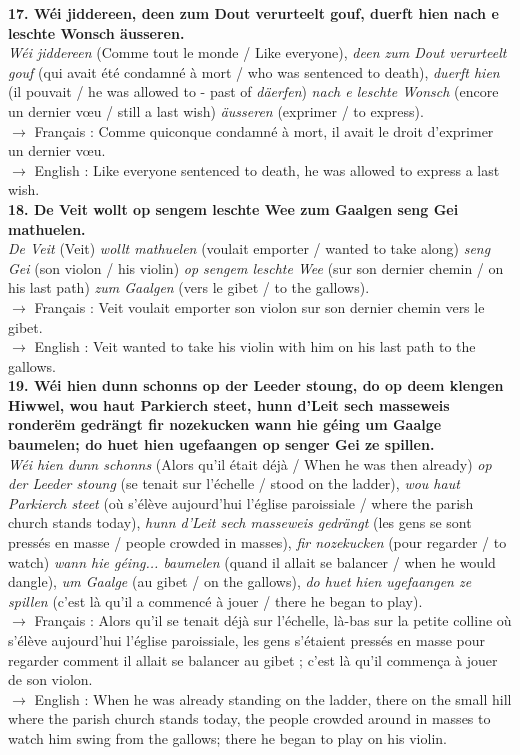 \textbf{17. Wéi jiddereen, deen zum Dout verurteelt gouf, duerft hien nach e leschte Wonsch äusseren.}\\
\textit{Wéi jiddereen} (Comme tout le monde / Like everyone), \textit{deen zum Dout verurteelt gouf} (qui avait été condamné à mort / who was sentenced to death), \textit{duerft hien} (il pouvait / he was allowed to - past of \textit{däerfen}) \textit{nach e leschte Wonsch} (encore un dernier vœu / still a last wish) \textit{äusseren} (exprimer / to express).\\
$\rightarrow$ Français : Comme quiconque condamné à mort, il avait le droit d'exprimer un dernier vœu.\\
$\rightarrow$ English : Like everyone sentenced to death, he was allowed to express a last wish.\\[0.5em]

\textbf{18. De Veit wollt op sengem leschte Wee zum Gaalgen seng Gei mathuelen.}\\
\textit{De Veit} (Veit) \textit{wollt mathuelen} (voulait emporter / wanted to take along) \textit{seng Gei} (son violon / his violin) \textit{op sengem leschte Wee} (sur son dernier chemin / on his last path) \textit{zum Gaalgen} (vers le gibet / to the gallows).\\
$\rightarrow$ Français : Veit voulait emporter son violon sur son dernier chemin vers le gibet.\\
$\rightarrow$ English : Veit wanted to take his violin with him on his last path to the gallows.\\[0.5em]

\textbf{19. Wéi hien dunn schonns op der Leeder stoung, do op deem klengen Hiwwel, wou haut Parkierch steet, hunn d'Leit sech masseweis ronderëm gedrängt fir nozekucken wann hie géing um Gaalge baumelen; do huet hien ugefaangen op senger Gei ze spillen.}\\
\textit{Wéi hien dunn schonns} (Alors qu'il était déjà / When he was then already) \textit{op der Leeder stoung} (se tenait sur l'échelle / stood on the ladder), \textit{wou haut Parkierch steet} (où s'élève aujourd'hui l'église paroissiale / where the parish church stands today), \textit{hunn d'Leit sech masseweis gedrängt} (les gens se sont pressés en masse / people crowded in masses), \textit{fir nozekucken} (pour regarder / to watch) \textit{wann hie géing... baumelen} (quand il allait se balancer / when he would dangle), \textit{um Gaalge} (au gibet / on the gallows), \textit{do huet hien ugefaangen ze spillen} (c'est là qu'il a commencé à jouer / there he began to play).\\
$\rightarrow$ Français : Alors qu'il se tenait déjà sur l'échelle, là-bas sur la petite colline où s'élève aujourd'hui l'église paroissiale, les gens s'étaient pressés en masse pour regarder comment il allait se balancer au gibet ; c'est là qu'il commença à jouer de son violon.\\
$\rightarrow$ English : When he was already standing on the ladder, there on the small hill where the parish church stands today, the people crowded around in masses to watch him swing from the gallows; there he began to play on his violin.\\[0.5em]

